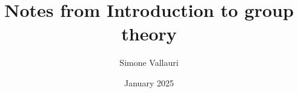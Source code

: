 \documentclass[a4paper,11pt]{article}
\author{Simone Vallauri}
\date{January 2025}
\theoremstyle{plain}          %
\theoremstyle{definition}     %
\theoremstyle{remark}
\begin{document}
\title{Notes from Introduction to group theory}

\maketitle




\end{document}
